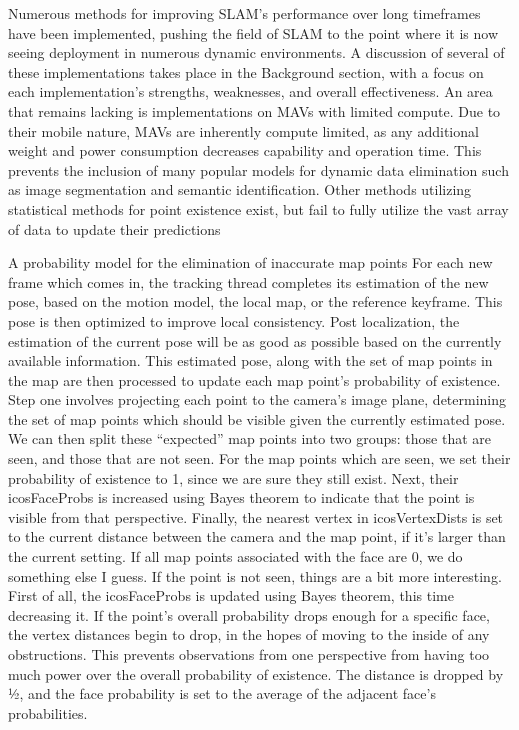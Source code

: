 Numerous methods for improving SLAM's performance over long timeframes have been implemented, pushing the field of SLAM to the point where it is now seeing deployment in numerous dynamic environments. A discussion of several of these implementations takes place in the Background section, with a focus on each implementation's strengths, weaknesses, and overall effectiveness. An area that remains lacking is implementations on MAVs with limited compute. Due to their mobile nature, MAVs are inherently compute limited, as any additional weight and power consumption decreases capability and operation time. This prevents the inclusion of many popular models for dynamic data elimination such as image segmentation and semantic identification. Other methods utilizing statistical methods for point existence exist, but fail to fully utilize the vast array of data to update their predictions


A probability model for the elimination of inaccurate map points
For each new frame which comes in, the tracking thread completes its estimation of the new pose, based on the motion model, the local map, or the reference keyframe. This pose is then optimized to improve local consistency. Post localization, the estimation of the current pose will be as good as possible based on the currently available information. This estimated pose, along with the set of map points in the map are then processed to update each map point’s probability of existence. Step one involves projecting each point to the camera’s image plane, determining the set of map points which should be visible given the currently estimated pose. We can then split these “expected” map points into two groups: those that are seen, and those that are not seen. For the map points which are seen, we set their probability of existence to 1, since we are sure they still exist. Next, their icosFaceProbs is increased using Bayes theorem to indicate that the point is visible from that perspective. Finally, the nearest vertex in icosVertexDists is set to the current distance between the camera and the map point, if it’s larger than the current setting. If all map points associated with the face are 0, we do something else I guess. If the point is not seen, things are a bit more interesting. First of all, the icosFaceProbs is updated using Bayes theorem, this time decreasing it. If the point’s overall probability drops enough for a specific face, the vertex distances begin to drop, in the hopes of moving to the inside of any obstructions. This prevents observations from one perspective from having too much power over the overall probability of existence. The distance is dropped by ½, and the face probability is set to the average of the adjacent face’s probabilities.

